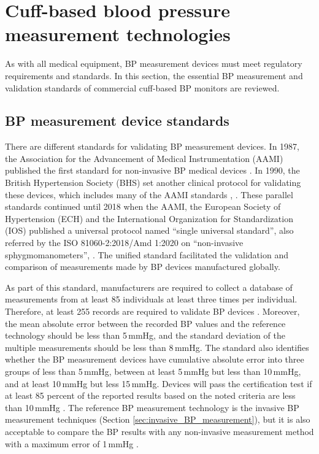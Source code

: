 \documentclass[journal,article,moreauthors]{Definitions/mdpi}
\begin{document}
\section{Cuff-based blood pressure measurement technologies}\label{sec: cuff-based}
As with all medical equipment, BP measurement devices must meet regulatory requirements and standards. In this section, the essential BP measurement and validation standards of commercial cuff-based BP monitors are reviewed.%

\subsection{BP measurement device standards}
There are different standards for validating BP measurement devices. In 1987, the Association for the Advancement of Medical Instrumentation (AAMI) published the first standard for non-invasive BP medical devices \citep{association1987american}. In 1990, the British Hypertension Society (BHS) set another clinical protocol for validating these devices, which includes many of the AAMI standards \citep{gervsak2009procedure}, \citep{stergiou2018universal}. These parallel standards continued until 2018 when the AAMI, the European Society of Hypertension (ECH) and the
International Organization for Standardization (IOS) published a universal protocol named ``single universal standard'', also  referred by the ISO 81060-2:2018/Amd 1:2020 on ``non-invasive sphygmomanometers'', \citep{ISO81060-2:2018/Amd.1:2020, worldtechnical}. The unified standard facilitated the validation and comparison of measurements made by BP devices manufactured globally.

As part of this standard, manufacturers are required to collect a database of measurements from at least 85 individuals at least three times per individual. Therefore, at least 255 records are required to validate BP devices \citep{mousavi2018designing}. Moreover, the mean absolute error between the recorded BP values and the reference technology should be less than 5\,mmHg, and the standard deviation of the multiple measurements should be less than 8\,mmHg. The standard also identifies whether the BP measurement devices have cumulative absolute error into three groups of less than 5\,mmHg, between at least 5\,mmHg but less than 10\,mmHg, and at least 10\,mmHg but less 15\,mmHg. Devices will pass the certification test if at least 85 percent of the reported results based on the noted criteria are less than 10\,mmHg \citep{worldtechnical}. The reference BP measurement technology is the invasive BP measurement techniques (Section \ref{sec:invasive_BP_measurement}), but it is also acceptable to compare the BP results with any non-invasive measurement method with a maximum error of 1\,mmHg \citep{worldtechnical}.
\end{document}
